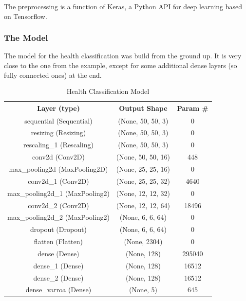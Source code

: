 \documentclass[a4paper,titlepage]{article}
\begin{document}
The preprocessing is a function of Keras, a Python API for deep learning based on Tensorflow.

\subsubsection{The Model}

The model for the health classification was build from the ground up.
It is very close to the one from the example, except for some additional dense layers (so fully connected ones) at the end.

\begin{table}[H]
    \centering
    \begin{tabular}{||c c c||}
        \hline
        Layer (type) & Output Shape & Param \# \\
        \hline
        \hline
        sequential (Sequential) & (None, 50, 50, 3) & 0 \\
        \hline
        resizing (Resizing) & (None, 50, 50, 3) & 0 \\
        \hline
        rescaling\_1 (Rescaling) & (None, 50, 50, 3) & 0 \\
        \hline
        conv2d (Conv2D) & (None, 50, 50, 16) & 448 \\
        \hline
        max\_pooling2d (MaxPooling2D) & (None, 25, 25, 16) & 0 \\
        \hline
        conv2d\_1 (Conv2D) & (None, 25, 25, 32) & 4640 \\
        \hline
        max\_pooling2d\_1 (MaxPooling2) & (None, 12, 12, 32) & 0 \\
        \hline
        conv2d\_2 (Conv2D) & (None, 12, 12, 64) & 18496 \\
        \hline
        max\_pooling2d\_2 (MaxPooling2) & (None, 6, 6, 64) & 0 \\
        \hline
        dropout (Dropout) & (None, 6, 6, 64) & 0 \\
        \hline
        flatten (Flatten) & (None, 2304) & 0 \\
        \hline
        dense (Dense) & (None, 128) & 295040 \\
        \hline
        dense\_1 (Dense) & (None, 128) & 16512 \\
        \hline
        dense\_2 (Dense) & (None, 128) & 16512 \\
        \hline
        dense\_varroa (Dense) & (None, 5) & 645 \\
        \hline
    \end{tabular}
    \caption{Health Classification Model}
\end{table}
\end{document}
